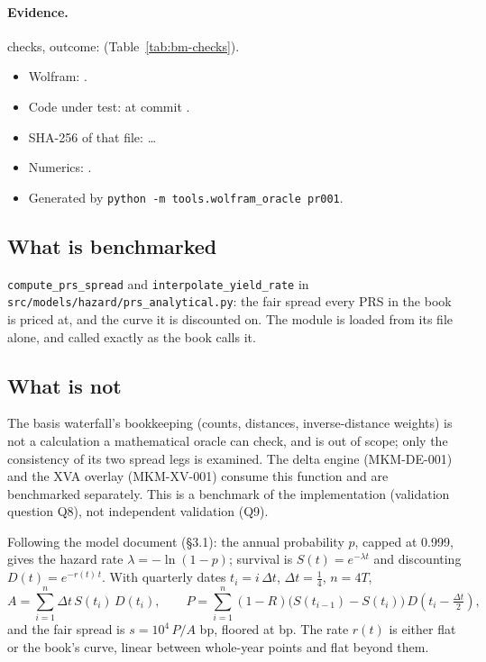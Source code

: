 \documentclass[11pt,a4paper]{article}
\begin{document}
\paragraph{Evidence.} \bmChecks{} checks, outcome: \bmOutcome{}
(Table~\ref{tab:bm-checks}).
\begin{itemize}[leftmargin=*,nosep]
\item Wolfram: \bmWolfram{}\bmWolframVia.
\item Code under test: \bmCodeFile{} at commit \bmCodeCommit{}\bmCodeDirty.
\item SHA-256 of that file: \bmCodeSha{}\ldots
\item Numerics: \bmNumerics.
\item Generated \bmGenerated{} by \texttt{python -m tools.wolfram\_oracle pr001}.
\end{itemize}

\mkmpurpose

\subsection{What is benchmarked}
\texttt{compute\_prs\_spread} and \texttt{interpolate\_yield\_rate} in
\texttt{src/models/hazard/prs\_analytical.py}: the fair spread every PRS in the
book is priced at, and the curve it is discounted on. The module is loaded from
its file alone, and called exactly as the book calls it.

\subsection{What is not}
The basis waterfall's bookkeeping (counts, distances, inverse-distance weights)
is not a calculation a mathematical oracle can check, and is out of scope; only
the consistency of its two spread legs is examined. The delta engine (MKM-DE-001)
and the XVA overlay (MKM-XV-001) consume this function and are benchmarked
separately. This is a benchmark of the implementation (validation question Q8),
not independent validation (Q9).

\mkmframework

Following the model document (\S3.1): the annual probability $p$, capped at
0.999, gives the hazard rate $\lambda=-\ln(1-p)$; survival is
$S(t)=e^{-\lambda t}$ and discounting $D(t)=e^{-r(t)\,t}$. With quarterly dates
$t_i=i\,\Delta t$, $\Delta t=\tfrac14$, $n=4T$,
\begin{equation}
A=\sum_{i=1}^{n}\Delta t\,S(t_i)\,D(t_i),\qquad
P=\sum_{i=1}^{n}(1-R)\bigl(S(t_{i-1})-S(t_i)\bigr)\,D\!\left(t_i-\tfrac{\Delta t}{2}\right),
\end{equation}
and the fair spread is $s=10^4\,P/A$ bp, floored at \bmFloor{} bp. The rate $r(t)$
is either flat or the book's curve, linear between whole-year points and flat
beyond them.
\end{document}
